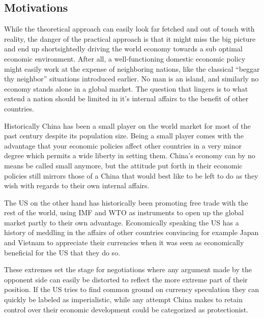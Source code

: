 



\subsection{Motivations}

While the theoretical approach can easily look far fetched and out of 
touch with reality, the danger of the practical approach is that it 
might miss the big picture and end up shortsightedly driving the world 
economy towards a sub optimal economic environment. After all, a 
well-functioning domestic economic policy might easily work at the 
expense of neighboring nations, like the classical ``beggar thy 
neighbor'' situations introduced earlier. No man is an island, and 
similarly no economy stands alone in a global market. The question that 
lingers is to what extend a nation should be limited in it's internal 
affairs to the benefit of other countries.

Historically China has been a small player on the world market for most 
of the past century despite its population size. Being a small player 
comes with the advantage that your economic policies affect other 
countries in a very minor degree which permits a wide liberty in setting 
them. China's economy can by no means be called small anymore, but the 
attitude put forth in their economic policies still mirrors those of a 
China that would best like to be left to do as they wish with regards to 
their own internal affairs.

The US on the other hand has historically been promoting free trade with 
the rest of the world, using IMF and WTO as instruments to open up the 
global market partly to their own advantage. Economically speaking the 
US has a history of meddling in the affairs of other countries 
convincing for example Japan and Vietnam to appreciate their currencies 
when it was seen as economically beneficial for the US that they do so.

These extremes set the stage for negotiations where any argument made by 
the opponent side can easily be distorted to reflect the more extreme 
part of their position. If the US tries to find common ground on 
currency speculation they can quickly be labeled as imperialistic, while 
any attempt China makes to retain control over their economic 
development could be categorized as protectionist.

